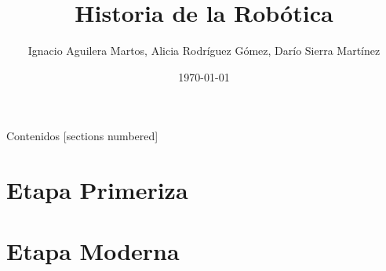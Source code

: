 \documentclass[10pt]{beamer}
\title{Historia de la Robótica}
\author{Ignacio Aguilera Martos, Alicia Rodríguez Gómez, Darío Sierra Martínez}
\date{\today}
\institute{Historia de las Matemáticas \\ \href{https://github.com/nacheteam/Historia-Robotica}{Trabajo completo en GitHub}}
\begin{document}
\maketitle

\begin{frame}[fragile]{Contenidos}
  [sections numbered]
  \tableofcontents[hideallsubsections]
\end{frame}

\section{Etapa Primeriza}



\section{Etapa Moderna}

\end{document}
